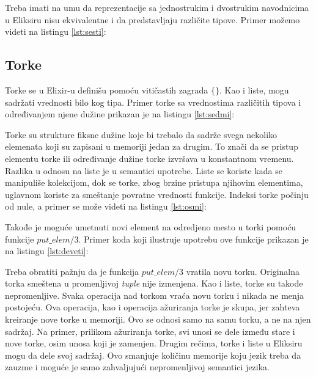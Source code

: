 \documentclass[12pt,oneside]{memoir}
\begin{document}
Treba imati na umu da reprezentacije sa jednostrukim i dvostrukim navodnicima u Eliksiru nisu ekvivalentne i da predstavljaju različite tipove. Primer možemo videti na listingu \ref{lst:sesti}:



\newpage

\subsection{Torke}

Torke se u Elixir-u definišu pomoću vitičastih zagrada $\{\}$. Kao i liste, mogu sadržati vrednosti bilo kog tipa. Primer torke sa vrednostima različitih tipova i određivanjem njene dužine prikazan je na listingu \ref{lst:sedmi}:



Torke su strukture fiksne dužine koje bi trebalo da sadrže svega nekoliko elemenata koji su zapisani u memoriji jedan za drugim. To znači da se pristup elementu torke ili određivanje dužine torke izvršava u konstantnom vremenu. Razlika u odnosu na liste je u semantici upotrebe. Liste se koriste kada se manipuliše kolekcijom, dok se torke, zbog brzine pristupa njihovim elementima, uglavnom koriste za smeštanje povratne vrednosti funkcije. Indeksi torke počinju od nule, a primer se može videti na listingu \ref{lst:osmi}:



Takođe je moguće umetnuti novi element na odredjeno mesto u torki pomoću funkcije $put\_elem/3$. Primer koda koji ilustruje upotrebu ove funkcije prikazan je na listingu \ref{lst:deveti}:



Treba obratiti pažnju da je funkcija $put\_elem/3$ vratila novu torku. Originalna torka smeštena u promenljivoj \textit{tuple} nije izmenjena. Kao i liste, torke su takođe nepromenljive. Svaka operacija nad torkom vraća novu torku i nikada ne menja postojeću. Ova operacija, kao i operacija ažuriranja torke je skupa, jer zahteva kreiranje nove torke u memoriji. Ovo se odnosi samo na samu torku, a ne na njen sadržaj. Na primer, prilikom ažuriranja torke, svi unosi se dele između stare i nove torke, osim unosa koji je zamenjen. Drugim rečima, torke i liste u Eliksiru mogu da dele svoj sadržaj. Ovo smanjuje količinu memorije koju jezik treba da zauzme i moguće je samo zahvaljujući nepromenljivoj semantici jezika.
\end{document}
